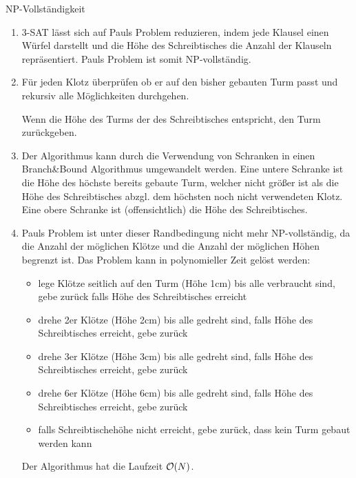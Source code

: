 \documentclass{article}
\begin{document}
\begin{exercise}{NP-Vollständigkeit}
  \begin{solution}
    \begin{enumerate}
      \item 3-SAT lässt sich auf Pauls Problem reduzieren, indem jede Klausel einen Würfel darstellt und die Höhe des Schreibtisches die Anzahl der Klauseln repräsentiert. Pauls Problem ist somit NP-vollständig.
      \item Für jeden Klotz überprüfen ob er auf den bisher gebauten Turm passt und rekursiv alle Möglichkeiten durchgehen.\par
            Wenn die Höhe des Turms der des Schreibtisches entspricht, den Turm zurückgeben.
            
      \item Der Algorithmus kann durch die Verwendung von Schranken in einen Branch\&Bound Algorithmus umgewandelt werden. Eine untere Schranke ist die Höhe des höchste bereits gebaute Turm, welcher nicht größer ist als die Höhe des Schreibtisches abzgl. dem höchsten noch nicht verwendeten Klotz. Eine obere Schranke ist (offensichtlich) die Höhe des Schreibtisches.
      \item Pauls Problem ist unter dieser Randbedingung nicht mehr NP-vollständig, da die Anzahl der möglichen Klötze und die Anzahl der möglichen Höhen begrenzt ist. Das Problem kann in polynomieller Zeit gelöst werden: \begin{itemize}
              \item lege Klötze seitlich auf den Turm (Höhe 1cm) bis alle verbraucht sind, gebe zurück falls Höhe des Schreibtisches erreicht
              \item drehe 2er Klötze (Höhe 2cm) bis alle gedreht sind, falls Höhe des Schreibtisches erreicht, gebe zurück
              \item drehe 3er Klötze (Höhe 3cm) bis alle gedreht sind, falls Höhe des Schreibtisches erreicht, gebe zurück
              \item drehe 6er Klötze (Höhe 6cm) bis alle gedreht sind, falls Höhe des Schreibtisches erreicht, gebe zurück
              \item falls Schreibtischehöhe nicht erreicht, gebe zurück, dass kein Turm gebaut werden kann
            \end{itemize} Der Algorithmus hat die Laufzeit $\mathcal{O}(N)$.
    \end{enumerate}
  \end{solution}
\end{exercise}
\end{document}
